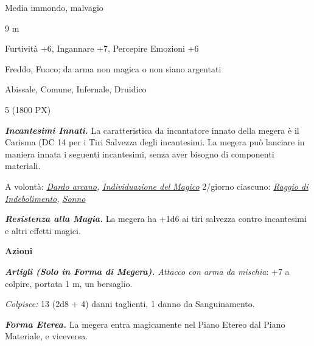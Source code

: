 \begin{multicols}{2}
{
\begin{description}[noitemsep, topsep=0pt, parsep=0pt, partopsep=0pt, itemsep=1pt, leftmargin=2.35cm,  labelwidth=2.2cm, itemindent=0cm, listparindent=0pt] %
\setlength{\baselineskip}{10pt}
\item[\textbf{Taglia/Tipo}] Media immondo, malvagio
\item[\textbf{Caratt.}] 
\item[\textbf{Punti Ferita}] 
\item[\textbf{Movimento}] 9 m
\item[\textbf{Tiri Salvez.}] 
\item[\textbf{Comp.}] Furtività +6, Ingannare +7, Percepire Emozioni +6
\item[\textbf{Res. Danni}] Freddo, Fuoco; da arma non magica o non siano argentati
\item[\textbf{Sensi}] 
\item[\textbf{Linguaggi}] Abissale, Comune, Infernale, Druidico
\item[\textbf{Sfida}] 5 (1800 PX)
\end{description}
\smallskip

\emph{\textbf{Incantesimi Innati.}} La caratteristica da incantatore innato della megera è il Carisma (DC 14 per i Tiri Salvezza degli incantesimi. La megera può lanciare in maniera innata i seguenti incantesimi, senza aver bisogno di componenti materiali.

A volontà: \emph{\hyperlink{Dardo arcano}{Dardo arcano}, \hyperlink{Individuazione del Magico}{Individuazione del Magico}} 2/giorno ciascuno: \emph{\hyperlink{Raggio di Indebolimento}{Raggio di Indebolimento}, \hyperlink{Sonno}{Sonno}}

\emph{\textbf{Resistenza alla Magia.}} La megera ha +1d6 ai tiri salvezza contro incantesimi e altri effetti magici.

\textbf{Azioni}

\emph{\textbf{Artigli (Solo in Forma di Megera).} Attacco con arma da mischia}: +7 a colpire, portata 1 m, un bersaglio.

\emph{Colpisce:} 13 (2d8 + 4) danni taglienti, 1 danno da Sanguinamento.

\emph{\textbf{Forma Eterea.}} La megera entra magicamente nel Piano Etereo dal Piano Materiale, e viceversa.

}
\end{multicols}
